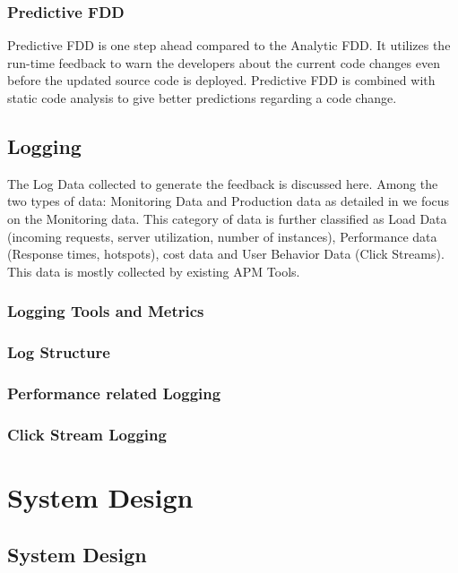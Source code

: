 \documentclass[article,type=msc,colorback,12pt,accentcolor=tud7b]{tudthesis}
\begin{document}
	\subsubsection{Predictive FDD}
Predictive FDD is one step ahead compared to the Analytic FDD. It utilizes the run-time feedback to warn the developers about the current code changes even before the updated source code is deployed. Predictive FDD is combined with static code analysis to give better predictions regarding a code change. 


 		
	\subsection{Logging}
		
		The Log Data collected to generate the feedback is discussed here. Among the two types of data: Monitoring Data and Production data as detailed in \cite{cito2015runtime} we focus on the Monitoring data. This category of data is further classified as Load Data (incoming requests, server utilization, number of instances), Performance data (Response times, hotspots), cost data and User Behavior Data (Click Streams). This data is mostly collected by existing APM Tools.
			
	\subsubsection{Logging Tools and Metrics}	
		
		\subsubsection{Log Structure}	
		
		\subsubsection{Performance related Logging}
		
		\subsubsection{Click Stream Logging}
	
	
	
 \cleardoublepage
 \section{System Design}	
 \subsection{System Design}
\end{document}

